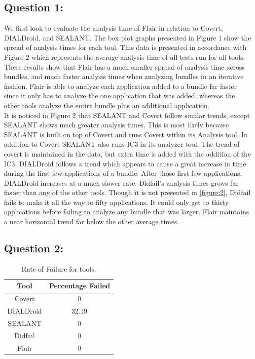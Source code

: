 \documentclass[twocolumn]{article}
\begin{document}
	\subsection{Question 1:}
		We first look to evaluate the analysis time of Flair in relation to Covert, DIALDroid, and SEALANT. The box plot graphs presented in Figure 1 show the spread of analysis times for each tool. This data is presented in accordance with Figure 2 which represents the average analysis time of all tests run for all tools. These results show that Flair has a much smaller spread of analysis time across bundles, and much faster analysis times when analyzing bundles in an iterative fashion. Flair is able to analyze each application added to a bundle far faster since it only has to analyze the one application that was added, whereas the other tools analyze the entire bundle plus an additional application.\\
		It is noticed in Figure 2 that SEALANT and Covert follow similar trends, except SEALANT shows much greater analysis times. This is most likely because SEALANT is built on top of Covert and runs Covert within its Analysis tool. In addition to Covert SEALANT also runs IC3 in its analyzer tool. The trend of covert is maintained in the data, but extra time is added with the addition of the IC3. DIALDroid follows a trend which appears to cause a great increase in time during the first few applications of a bundle. After those first few applications, DIALDroid increases at a much slower rate. Didfail's analysis times grows far faster than any of the other tools. Though it is not presented in \ref{figure:2}, Didfail fails to make it all the way to fifty applications. It could only get to thirty applications before failing to analyze any bundle that was larger. Flair maintains a near horizontal trend far below the other average times.
		
	\subsection{Question 2:}
	
		\begin{table}[h]
		\begin{center}
			\begin{tabular}{ |c c| }
				\hline
				Tool & Percentage Failed\\
				\hline
				Covert & 0\\
				DIALDroid & 32.19\\
				SEALANT & 0\\
				Didfail & 0\\
				Flair & 0\\
				\hline
			\end{tabular}		
			\end{center}
			\label{table:2}
			\caption{Rate of Failure for tools.}
		\end{table}
		
\end{document}
